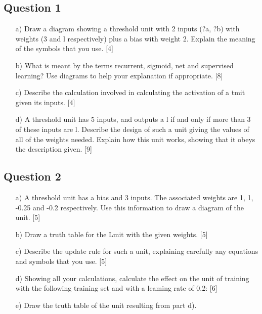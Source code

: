 \documentclass[a4paper,11pt]{report}
\begin{document}
\subsection{Question 1}
\begin{itemize}
\item[a)] Draw a diagram showing a threshold unit with 2 inputs (?a, ?b) with weights (3 and l
respectively) plus a bias with weight 2. Explain the meaning of the symbols that you
use.
[4]
\item[b)] What is meant by the terms recurrent, sigmoid, net and supervised learning? Use
diagrams to help your explanation if appropriate.
[8]
\item[c)] Describe the calculation involved in calculating the activation of a tmit given its
inputs.
[4]
\item[d)] A threshold unit has 5 inputs, and outputs a l if and only if more than 3 of these
inputs are l.
Describe the design of such a unit giving the values of all of the weights needed.
Explain how this unit works, showing that it obeys the description given.
[9]
\end{itemize}

\subsection{Question 2}
\begin{itemize}
\item[a)]  A threshold unit has a bias and 3 inputs. The associated weights are 1, 1, -0.25 and
-0.2 respectively. Use this information to draw a diagram of the unit.
[5]
\item[b)] Draw a truth table for the Lmit with the given weights.
[5]
\item[c)] Describe the update rule for such a unit, explaining carefully any equations and
symbols that you use.
[5]
\item[d)] Showing all your calculations, calculate the effect on the unit of training with the
following training set and with a leaming rate of 0.2:
[6]
\item[e)] Draw the truth table of the unit resulting from part d).
\end{itemize}

\newpage
\end{document}

